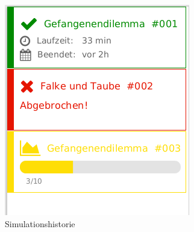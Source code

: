 \documentclass[parskip=full,11pt]{scrartcl}
\begin{document}
\begin{figure}[hb]
	\centering
	\includegraphics[height=0.5\linewidth ]{images/history.png}
	\caption{\label{fig:history}
		Simulationshistorie }
\end{figure}
\end{document}
